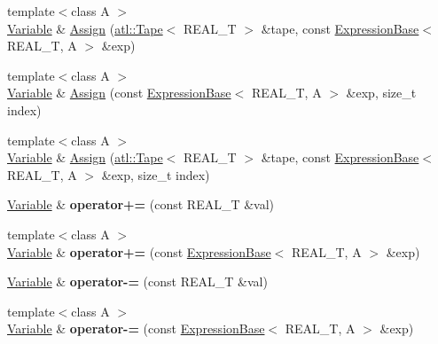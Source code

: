 \begin{DoxyCompactItemize}
\item 
{\footnotesize template$<$class A $>$ }\\\hyperlink{structatl_1_1_variable}{Variable} \& \hyperlink{structatl_1_1_variable_a753439be059d8e894aa72c4a521a193d}{Assign} (\hyperlink{classatl_1_1_tape}{atl\+::\+Tape}$<$ R\+E\+A\+L\+\_\+\+T $>$ \&tape, const \hyperlink{structatl_1_1_expression_base}{Expression\+Base}$<$ R\+E\+A\+L\+\_\+\+T, A $>$ \&exp)
\item 
{\footnotesize template$<$class A $>$ }\\\hyperlink{structatl_1_1_variable}{Variable} \& \hyperlink{structatl_1_1_variable_a2a5fbe56961922c12103b72855d438fe}{Assign} (const \hyperlink{structatl_1_1_expression_base}{Expression\+Base}$<$ R\+E\+A\+L\+\_\+\+T, A $>$ \&exp, size\+\_\+t index)
\item 
{\footnotesize template$<$class A $>$ }\\\hyperlink{structatl_1_1_variable}{Variable} \& \hyperlink{structatl_1_1_variable_ac15e910a224d189944c71776ceb67cc1}{Assign} (\hyperlink{classatl_1_1_tape}{atl\+::\+Tape}$<$ R\+E\+A\+L\+\_\+\+T $>$ \&tape, const \hyperlink{structatl_1_1_expression_base}{Expression\+Base}$<$ R\+E\+A\+L\+\_\+\+T, A $>$ \&exp, size\+\_\+t index)
\item 
\hypertarget{structatl_1_1_variable_aad8e1d6b2c5258b17020f8ee694ffb95}{\hyperlink{structatl_1_1_variable}{Variable} \& {\bfseries operator+=} (const R\+E\+A\+L\+\_\+\+T \&val)}\label{structatl_1_1_variable_aad8e1d6b2c5258b17020f8ee694ffb95}

\item 
\hypertarget{structatl_1_1_variable_a575ec695135b3abdcae2141434e87100}{{\footnotesize template$<$class A $>$ }\\\hyperlink{structatl_1_1_variable}{Variable} \& {\bfseries operator+=} (const \hyperlink{structatl_1_1_expression_base}{Expression\+Base}$<$ R\+E\+A\+L\+\_\+\+T, A $>$ \&exp)}\label{structatl_1_1_variable_a575ec695135b3abdcae2141434e87100}

\item 
\hypertarget{structatl_1_1_variable_ab822ce13f7a8d979c7ae0253a5adea07}{\hyperlink{structatl_1_1_variable}{Variable} \& {\bfseries operator-\/=} (const R\+E\+A\+L\+\_\+\+T \&val)}\label{structatl_1_1_variable_ab822ce13f7a8d979c7ae0253a5adea07}

\item 
\hypertarget{structatl_1_1_variable_ad1be31d4f6e25cb4e26b0fb6cf61e91a}{{\footnotesize template$<$class A $>$ }\\\hyperlink{structatl_1_1_variable}{Variable} \& {\bfseries operator-\/=} (const \hyperlink{structatl_1_1_expression_base}{Expression\+Base}$<$ R\+E\+A\+L\+\_\+\+T, A $>$ \&exp)}\label{structatl_1_1_variable_ad1be31d4f6e25cb4e26b0fb6cf61e91a}


\end{DoxyCompactItemize}
